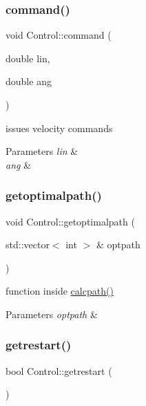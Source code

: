 \subsubsection{\texorpdfstring{command()}{command()}}
{\footnotesize\ttfamily void Control\+::command (\begin{DoxyParamCaption}\item[{double}]{lin,  }\item[{double}]{ang }\end{DoxyParamCaption})\hspace{0.3cm}{\ttfamily [protected]}}



issues velocity commands 


\begin{DoxyParams}{Parameters}
{\em lin} & \\
\hline
{\em ang} & \\
\hline
\end{DoxyParams}
\mbox{\label{classControl_af846dd07501030d430893f17cd4a4178}} 
\subsubsection{\texorpdfstring{getoptimalpath()}{getoptimalpath()}}
{\footnotesize\ttfamily void Control\+::getoptimalpath (\begin{DoxyParamCaption}\item[{std\+::vector$<$ int $>$ \&}]{optpath }\end{DoxyParamCaption})\hspace{0.3cm}{\ttfamily [protected]}}



function inside \hyperlink{classControl_a9bfe498567206c176b0e23d71708d6e3}{calcpath()} 


\begin{DoxyParams}{Parameters}
{\em optpath} & \\
\hline
\end{DoxyParams}
\mbox{\label{classControl_af7401b14ae40f38234d29b6adaf5d8a6}} 
\subsubsection{\texorpdfstring{getrestart()}{getrestart()}}
{\footnotesize\ttfamily bool Control\+::getrestart (\begin{DoxyParamCaption}{ }\end{DoxyParamCaption})}



